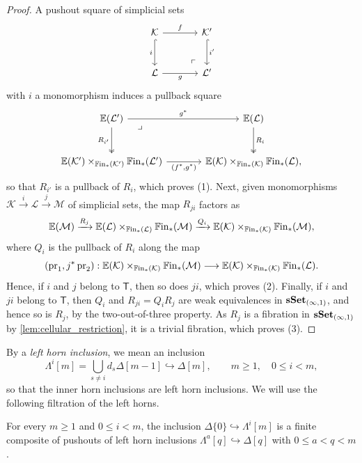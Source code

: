 \documentclass[10pt,reqno]{amsart}
\begin{document}
\begin{proof}
A pushout square of simplicial sets
\[
\begin{tikzcd}[ampersand replacement=\&, sep=large]
\mathcal K\arrow[r,"f"]\arrow[d,hook,"i"']
\&\mathcal K'\arrow[d,hook,"i'"]\\
\mathcal L\arrow[r,"g"']
\&\mathcal L'\arrow[ul,phantom,"\ulcorner",very near start]
\end{tikzcd}
\]
with $i$ a monomorphism induces a pullback square
\[
\begin{tikzcd}[ampersand replacement=\&, sep=large]
\mathbb E(\mathcal L')\arrow[r,"g^*"]\arrow[d,two heads,"R_{i'}"']
  \arrow[dr,phantom,"\lrcorner",very near start]
\&\mathbb E(\mathcal L)\arrow[d,two heads,"R_i"]\\
\mathbb E(\mathcal K')\times_{\bisimFin(\mathcal K')}\bisimFin(\mathcal L')
  \arrow[r,"{(f^*,g^*)}"']
\&\mathbb E(\mathcal K)\times_{\bisimFin(\mathcal K)}\bisimFin(\mathcal L),
\end{tikzcd}
\]
so that $R_{i'}$ is a pullback of $R_i$, which proves \textup{(1)}.
Next, given monomorphisms
$\mathcal K\xrightarrow{i}\mathcal L\xrightarrow{j}\mathcal M$ of
simplicial sets, the map $R_{ji}$ factors as
\[
\mathbb E(\mathcal M)\xrightarrow{R_j}
\mathbb E(\mathcal L)\times_{\mathbb{F}\mathrm{in}_*(\mathcal L)}\mathbb{F}\mathrm{in}_*(\mathcal M)
\xrightarrow{Q_i}
\mathbb E(\mathcal K)\times_{\mathbb{F}\mathrm{in}_*(\mathcal K)}\mathbb{F}\mathrm{in}_*(\mathcal M),
\]
where $Q_i$ is the pullback of $R_i$ along the map
\[
(\operatorname{pr}_1,j^*\operatorname{pr}_2):
\mathbb E(\mathcal K)\times_{\mathbb{F}\mathrm{in}_*(\mathcal K)}\mathbb{F}\mathrm{in}_*(\mathcal M)
\longrightarrow
\mathbb E(\mathcal K)\times_{\mathbb{F}\mathrm{in}_*(\mathcal K)}\mathbb{F}\mathrm{in}_*(\mathcal L).
\]
Hence, if $i$ and $j$ belong to $\mathsf T$, then so does
$ji$, which proves \textup{(2)}. Finally, if $i$ and $ji$ belong
to $\mathsf T$, then $Q_i$ and $R_{ji}=Q_iR_j$ are weak
equivalences in $\mathbf{sSet}_{(\infty,1)}$, and hence so is $R_j$, by
the two-out-of-three property. As $R_j$ is a fibration in
$\mathbf{sSet}_{(\infty,1)}$ by \cref{lem:cellular_restriction}, it is a
trivial fibration, which proves \textup{(3)}.
\end{proof}

By a \emph{left horn inclusion}, we mean an inclusion
\[
\Lambda^i[m]=\bigcup_{s\ne i}d_s\Delta[m-1]
\hookrightarrow\Delta[m],
\qquad m\geq1,\quad 0\leq i<m,
\]
so that the inner horn inclusions are left horn inclusions. We will
use the following filtration of the left horns.

\begin{lemma}
\label{lem:initial_vertex_to_left_horn}
For every $m\geq1$ and $0\leq i<m$, the inclusion
$\Delta\{0\}\hookrightarrow\Lambda^i[m]$
is a finite composite of pushouts of left horn inclusions
$\Lambda^a[q]\hookrightarrow\Delta[q]$ with
$0\leq a<q<m$.
\end{lemma}
\end{document}
